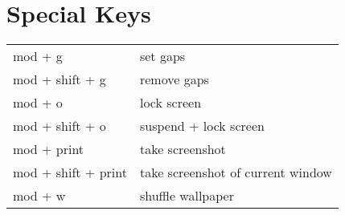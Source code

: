\documentclass[
    10pt,
    a4paper,
    notitlepage,
]{scrartcl}
\begin{document}
\section{Special Keys}
\begin{tabular}{p{4cm}l}
    mod + g             & set gaps                              \\
    mod + shift + g     & remove gaps                           \\
    mod + o             & lock screen                           \\
    mod + shift + o     & suspend + lock screen                 \\
    mod + print         & take screenshot                       \\
    mod + shift + print & take screenshot of current window     \\
    mod + w             & shuffle wallpaper
\end{tabular}
\end{document}
